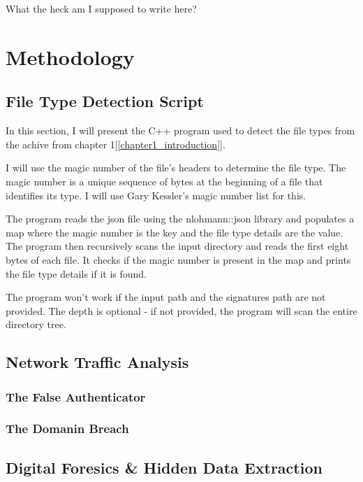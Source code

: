 \documentclass[pdflatex,sn-mathphys-num]{sn-jnl}
\begin{document}
What the heck am I supposed to write here?

\section{Methodology}\label{methodology}

\subsection{File Type Detection Script}\label{chapter1}

\par In this section, I will present the C++ program used to detect the file types from the achive from chapter
1[\ref{chapter1_introduction}].

\par I will use the magic number of the file's headers to determine the file type. The magic number is a unique sequence
of bytes at the beginning of a file that identifies its type. I will use Gary Kessler's magic number list\cite{filesigs}
for this.

\par The program reads the json file using the nlohmann::json library\cite{nlohmann_json} and populates a map where
the magic number is the key and the file type details are the value. The program then recursively scans the input
directory and reads the first eight bytes of each file. It checks if the magic number is present in the map and prints
the file type details if it is found.

\par The program won't work if the input path and the signatures path are not provided. The depth is optional \-- if not
provided, the program will scan the entire directory tree.

\subsection{Network Traffic Analysis}

\subsubsection{The False Authenticator}

\subsubsection{The Domanin Breach}

\subsection{Digital Foresics \& Hidden Data Extraction}
\end{document}
